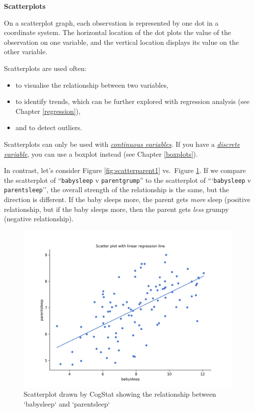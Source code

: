 \documentclass[
]{book}
\providecommand{\tightlist}{%
  \setlength{\itemsep}{0pt}\setlength{\parskip}{0pt}}
\newenvironment{callouttitle}{}{}
\theoremstyle{definition}
\theoremstyle{definition}
\theoremstyle{definition}
\theoremstyle{definition}
\theoremstyle{remark}
\begin{document}
\begin{callout}

\begin{callouttitle}
\textbf{Scatterplots}

\end{callouttitle}

\nopagebreak

On a scatterplot graph, each observation is represented by one dot in a coordinate system. The horizontal location of the dot plots the value of the observation on one variable, and the vertical location displays its value on the other variable.

Scatterplots are used often:

\begin{itemize}
\tightlist
\item
  to visualise the relationship between two variables,
\item
  to identify trends, which can be further explored with regression analysis (see Chapter \ref{regression}),
\item
  and to detect outliers.
\end{itemize}

Scatterplots can only be used with \protect\hyperlink{continuousdiscrete}{\emph{continuous variables}}. If you have a \protect\hyperlink{continuousdiscrete}{\emph{discrete variable}}, you can use a boxplot instead (see Chapter \ref{boxplots}).

\end{callout}

In contrast, let's consider Figure \ref{fig:scatterparent1} vs.~Figure \ref{fig:scatterparent2}. If we compare the scatterplot of ``\texttt{babysleep} v \texttt{parentgrump}'' to the scatterplot of ```\texttt{babysleep} v \texttt{parentsleep}'', the overall strength of the relationship is the same, but the direction is different. If the baby sleeps more, the parent gets \emph{more} sleep (positive relationship, but if the baby sleeps more, then the parent gets \emph{less} grumpy (negative relationship).

\begin{figure}

{\centering \includegraphics[width=0.66\linewidth]{resources/image/parentsleepbabysleepplot} 

}

\caption{Scatterplot drawn by CogStat showing the relationship between `babysleep` and `parentsleep`}\label{fig:scatterparent2}
\end{figure}
\end{document}
